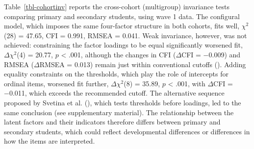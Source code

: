 \documentclass[
  11pt,
]{article}
\begin{document}
Table~\ref{tbl-cohortinv} reports the cross-cohort (multigroup)
invariance tests comparing primary and secondary students, using wave 1
data. The configural model, which imposes the same four-factor structure
in both cohorts, fits well, \(\chi^2\)(28) = 47.65, CFI = 0.991, RMSEA =
0.041. Weak invariance, however, was not achieved: constraining the
factor loadings to be equal significantly worsened fit,
\(\Delta \chi^2\)(4) = 20.77, \(p\) \textless{} .001, although the
changes in CFI (\(\Delta\)CFI = −0.009) and RMSEA (\(\Delta\)RMSEA =
0.013) remain just within conventional cutoffs
(). Adding equality
constraints on the thresholds, which play the role of intercepts for
ordinal items, worsened fit further, \(\Delta \chi^2\)(8) = 35.89, \(p\)
\textless{} .001, with \(\Delta\)CFI = −0.011, which exceeds the
recommended cutoff. The alternative sequence proposed by Svetina et al.
(), which tests
thresholds before loadings, led to the same conclusion (see
supplementary material). The relationship between the latent factors and
their indicators therefore differs between primary and secondary
students, which could reflect developmental differences or differences
in how the items are interpreted.
\end{document}
